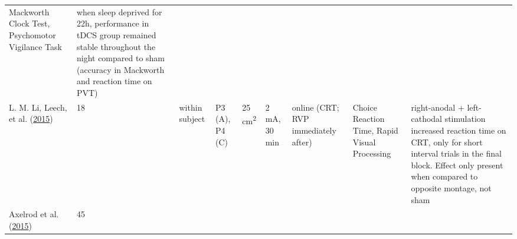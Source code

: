 \documentclass[11pt,]{memoir}
\begin{document}
\begin{longtable}[]{@{}lllllllll@{}}
\begin{minipage}[t]{0.12\columnwidth}
Mackworth Clock Test,
Psychomotor Vigilance
Task\strut
\end{minipage} & \begin{minipage}[t]{0.25\columnwidth}\raggedright
when sleep deprived for 22h, performance in tDCS group
remained stable throughout the night compared to sham
(accuracy in Mackworth and reaction time on PVT)\strut
\end{minipage}\tabularnewline
\begin{minipage}[t]{0.09\columnwidth}\raggedright
L. M. Li, Leech, et al. (\protect\hyperlink{ref-Li2015a}{2015})\strut
\end{minipage} & \begin{minipage}[t]{0.02\columnwidth}\raggedright
18\strut
\end{minipage} & \begin{minipage}[t]{0.04\columnwidth}\raggedright
within
subject\strut
\end{minipage} & \begin{minipage}[t]{0.10\columnwidth}\raggedright
P3 (A), P4 (C)\strut
\end{minipage} & \begin{minipage}[t]{0.03\columnwidth}\raggedright
25
cm\textsuperscript{2}\strut
\end{minipage} & \begin{minipage}[t]{0.05\columnwidth}\raggedright
2 mA, 30
min\strut
\end{minipage} & \begin{minipage}[t]{0.06\columnwidth}\raggedright
online
(CRT;
RVP
immediately
after)\strut
\end{minipage} & \begin{minipage}[t]{0.12\columnwidth}\raggedright
Choice Reaction Time,
Rapid Visual Processing\strut
\end{minipage} & \begin{minipage}[t]{0.25\columnwidth}\raggedright
right-anodal + left-cathodal stimulation increased
reaction time on CRT, only for short interval trials in
the final block. Effect only present when compared to
opposite montage, not sham\strut
\end{minipage}\tabularnewline
\begin{minipage}[t]{0.09\columnwidth}\raggedright
Axelrod et al. (\protect\hyperlink{ref-Axelrod2015}{2015})\strut
\end{minipage} & \begin{minipage}[t]{0.02\columnwidth}\raggedright
45\strut
\end{minipage} & \begin{minipage}[t]{0.04\columnwidth}\raggedright

\end{minipage}
\end{longtable}
\end{document}
